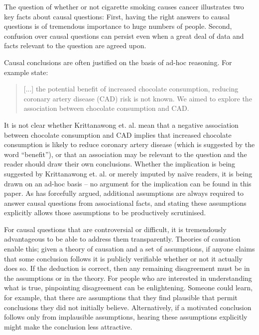 The question of whether or not cigarette smoking causes cancer illustrates two key facts about causal questions: First, having the right answers to causal questions is of tremendous importance to huge numbers of people. Second, confusion over causal questions can persist even when a great deal of data and facts relevant to the question are agreed upon.

Causal conclusions are often justified on the basis of ad-hoc reasoning. For example \citet{krittanawong_association_2020} state:

\begin{quote}
[...] the potential benefit of increased chocolate consumption, reducing coronary artery disease (CAD) risk is not known. We aimed to explore the association between chocolate consumption and CAD.
\end{quote}

It is not clear whether Krittanawong et. al. mean that a negative association between chocolate consumption and CAD implies that increased chocolate consumption is likely to reduce coronary artery disease (which is suggested by the word ``benefit''), or that an association may be relevant to the question and the reader should draw their own conclusions. Whether the implication is being suggested by Krittanawong et. al. or merely imputed by na\"ive readers, it is being drawn on an ad-hoc basis -- no argument for the implication can be found in this paper. As \citet{pearl_causality:_2009} has forcefully argued, additional assumptions are always required to answer causal questions from associational facts, and stating these assumptions explicitly allows those assumptions to be productively scrutinised.

For causal questions that are controversial or difficult, it is tremendously advantageous to be able to address them transparently. Theories of causation enable this; given a theory of causation and a set of assumptions, if anyone claims that some conclusion follows it is publicly verifiable whether or not it actually does so. If the deduction is correct, then any remaining disagreement must be in the assumptions or in the theory. For people who are interested in understanding what is true, pinpointing disagreement can be enlightening. Someone could learn, for example, that there are assumptions that they find plausible that permit conclusions they did not initially believe. Alternatively, if a motivated conclusion follows only from implausible assumptions, hearing these assumptions explicitly might make the conclusion less attractive. 

